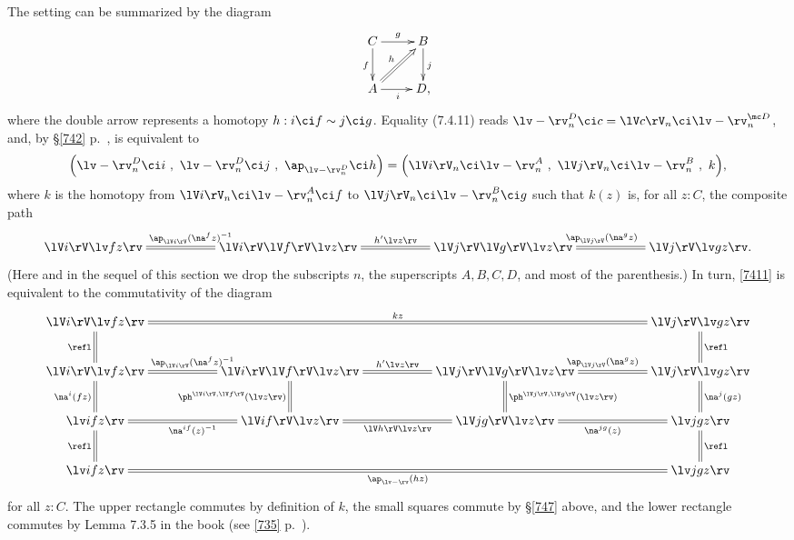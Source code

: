 \documentclass[12pt]{article}
\begin{document}
The setting can be summarized by the diagram 
$$
\xymatrix{C\ar[r]^g\ar[d]_f&B\ar[d]^j\\ A\ar[r]_i\ar@{=>}[ur]^h&D,}
$$ 
where the double arrow represents a homotopy $h:i\ci f\sim j\ci g$. Equality (7.4.11) reads $\lv-\rv^D_n\ci c=\lV c\rV_n\ci\lv-\rv^{\mc D}_n$, and, by \S\ref{742} p.~\pageref{742}, is equivalent to
\begin{equation}\label{7411}
\Big(\lv-\rv^D_n\ci i\ ,\ \lv-\rv^D_n\ci j\ ,\ \ap_{\lv-\rv^D_n}\ci h\Big)
=
\Big(\lV i\rV_n\ci\lv-\rv^A_n\ ,\ \lV j\rV_n\ci\lv-\rv^B_n\ ,\ k\Big),
\end{equation}
where $k$ is the homotopy from $\lV i\rV_n\ci\lv-\rv^A_n\ci f$ to $\lV j\rV_n\ci\lv-\rv^B_n\ci g$ such that $k(z)$ is, for all $z:C$, the composite path
$$
\xymatrix{
\lV i\rV\lv fz\rv&&
\lV i\rV\lV f\rV\lv z\rv\ar@{=}[ll]_{\ap_{\lV i\rV}(\na^fz)^{-1}}\ar@{=}[rr]^{h'\lv z\rv}&&
\lV j\rV\lV g\rV\lv z\rv\ar@{=}[rr]^{\ap_{\lV j\rV}(\na^gz)}&&
\lV j\rV\lv gz\rv.}
$$ 
(Here and in the sequel of this section we drop the subscripts $n$, the superscripts $A,B,C,D$, and most of the parenthesis.) In turn, \eqref{7411} is equivalent to the commutativity of the diagram %
$$ 
\xymatrix{
\lV i\rV\lv fz\rv\ar@{=}[d]_{\refl}\ar@{=}[rrrrrr]^{kz}&&&&&&\lV j\rV\lv gz\rv\ar@{=}[d]^{\refl}\\
\lV i\rV\lv fz\rv\ar@{=}[d]_{\na^i(fz)}&&
\lV i\rV\lV f\rV\lv z\rv\ar@{=}[ll]_{\ap_{\lV i\rV}(\na^fz)^{-1}}\ar@{=}[d]_{\ph^{\lV i\rV,\lV f\rV}(\lv z\rv)}\ar@{=}[rr]^{h'\lv z\rv}&&
\lV j\rV\lV g\rV\lv z\rv\ar@{=}[d]^{\ph^{\lV j\rV,\lV g\rV}(\lv z\rv)}\ar@{=}[rr]^{\ap_{\lV j\rV}(\na^gz)}&&
\lV j\rV\lv gz\rv\ar@{=}[d]^{\na^j(gz)}\\
%
\lv ifz\rv&&\lV if\rV\lv z\rv\ar@{=}[rr]_{\lV h\rV\lv z\rv}\ar@{=}[ll]^{\na^{if}(z)^{-1}}&&\lV jg\rV\lv z\rv\ar@{=}[rr]_{\na^{jg}(z)}&&\lv jgz\rv\\ 
\lv ifz\rv\ar@{=}[u]^{\refl}\ar@{=}[rrrrrr]_{\ap_{\lv-\rv}(hz)}&&&&&&\lv jgz\rv\ar@{=}[u]_{\refl}}
$$ 
for all $z:C$. The upper rectangle commutes by definition of $k$, the small squares commute by \S\ref{747} above, and the lower rectangle commutes by Lemma 7.3.5 in the book (see \eqref{735} p.~\pageref{735}).
\end{document}
